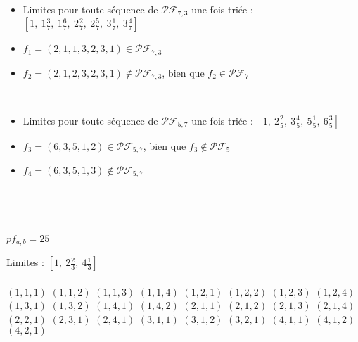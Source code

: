 \begin{example}[Définition 19 : $a > b$ : $a = 7$, $b = 3$]
    ~
    \begin{itemize}
        \item Limites pour toute séquence de $\mathcal{PF}_{7,3}$
            une fois triée : $[1,\ 1 \frac{3}{7},\ 1 \frac{6}{7},\ 
            2 \frac{2}{7},\ 2 \frac{5}{7},\ 3 \frac{1}{7},\ 
            3 \frac{4}{7}]$
        \item $f_1 = (2, 1, 1, 3, 2, 3, 1) \in
            \mathcal{PF}_{7,3}$
        \item $f_2 = (2, 1, 2, 3, 2, 3, 1) \notin
            \mathcal{PF}_{7,3}$, bien que $f_2 \in
            \mathcal{PF}_7$
    \end{itemize}
\end{example}

\begin{example}[Définition 19 : $a < b$ : $a = 5$, $b = 7$]
    ~
    \begin{itemize}
        \item Limites pour toute séquence de $\mathcal{PF}_{5,7}$
            une fois triée : $[1,\ 2 \frac{2}{5},\ 3 \frac{4}{5},\ 
            5 \frac{1}{5},\ 6 \frac{3}{5}]$
        \item $f_3 = (6, 3, 5, 1, 2) \in
            \mathcal{PF}_{5,7}$, bien que $f_3 \notin
            \mathcal{PF}_5$
        \item $f_4 = (6, 3, 5, 1, 3) \notin
            \mathcal{PF}_{5,7}$\\
    \end{itemize}
\end{example}

\begin{example}[Théorème 20 : $a = 3, b = 5$]
    ~\\
    \begin{itemize*}\\
        \item $pf_{a,b} = 25$
        \item Limites : $[1,\ 2 \frac{2}{3},\ 
            4 \frac{1}{3}]$\\\\
        \subitem $(1, 1, 1)$
        \subitem $(1, 1, 2)$
        \subitem $(1, 1, 3)$
        \subitem $(1, 1, 4)$
        \subitem $(1, 2, 1)$
        \subitem $(1, 2, 2)$
        \subitem $(1, 2, 3)$
        \subitem $(1, 2, 4)$
        \subitem $(1, 3, 1)$
        \subitem $(1, 3, 2)$
        \subitem $(1, 4, 1)$
        \subitem $(1, 4, 2)$
        \subitem $(2, 1, 1)$
        \subitem $(2, 1, 2)$
        \subitem $(2, 1, 3)$
        \subitem $(2, 1, 4)$
        \subitem $(2, 2, 1)$
        \subitem $(2, 3, 1)$
        \subitem $(2, 4, 1)$
        \subitem $(3, 1, 1)$
        \subitem $(3, 1, 2)$
        \subitem $(3, 2, 1)$
        \subitem $(4, 1, 1)$
        \subitem $(4, 1, 2)$
        \subitem $(4, 2, 1)$\\
    \end{itemize*}
\end{example}

